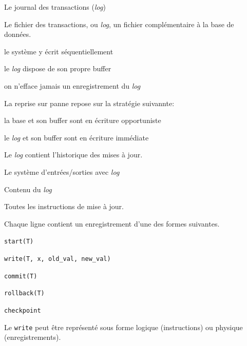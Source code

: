 \documentclass[aspectratio=169, handout]{beamer} %
\begin{document}
\begin{frame}{Le journal des transactions (\textit{log})}

Le fichier
des transactions, ou \textit{log}, un fichier complémentaire à la base de données.

\vfill

\begin{redbullet}
  \item le système y écrit \alert{séquentiellement}
  \item le \textit{log} dispose de son propre buffer  
    \item on n'efface \alert{jamais} un enregistrement du \textit{log}
\end{redbullet}

\vfill

La reprise sur panne repose sur la stratégie suivannte:

\vfill

\begin{redbullet}
  \item \alert{la base et son buffer}  sont  en écriture \alert{opportuniste}
  \item \alert{le \textit{log} et son buffer} sont  en écriture \alert{immédiate}
\end{redbullet}

\vfill

\begin{blocgauche}
Le \textit{log} contient l'historique des
mises à jour.
\end{blocgauche}
\end{frame}


\begin{frame}{Le système d'entrées/sorties avec \textit{log}}




\end{frame}
 
 
 
\begin{frame}{Contenu du \textit{log}}

Toutes les instructions de mise à jour.

\vfill

Chaque ligne contient un enregistrement d'une des formes suivantes.

\begin{redbullet}
  \item \texttt{start(T)}
  \item \texttt{write(T, x, old\_val, new\_val)}
  \item \texttt{commit(T)}
  \item \texttt{rollback(T)}
  \item \texttt{checkpoint}
\end{redbullet}

\vfill

\begin{blocgauche}
Le \texttt{write} peut être
représenté sous forme \alert{logique}
(instructions) ou \alert{physique}
(enregistrements).
\end{blocgauche}
\end{frame}
\end{document}
